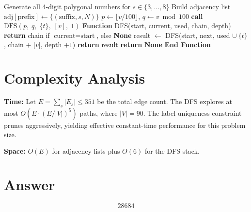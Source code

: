 \documentclass[12pt,a4paper]{article}
\newcommand{\Function}[2]{\STATE \textbf{Function} #1(#2)}
\newcommand{\EndFunction}{\STATE \textbf{End Function}}
\newcommand{\RETURN}{\STATE \textbf{return} }
\begin{document}
\begin{algorithm}[H]
\caption{Cyclical Figurate Number Search}
\begin{algorithmic}[1]
\STATE Generate all 4-digit polygonal numbers for $s \in \{3,\ldots,8\}$
\STATE Build adjacency list $\mathrm{adj}[\text{prefix}] \gets \{(\text{suffix}, s, N)\}$
    \STATE $p \gets \lfloor v/100 \rfloor$, $q \gets v \bmod 100$
    \STATE \textbf{call} $\mathrm{DFS}(p,\; q,\; \{t\},\; [v],\; 1)$
\ENDFOR
\STATE
\Function{DFS}{start, current, used, chain, depth}
        \RETURN chain if $\text{current} = \text{start}$, else \textbf{None}
    \ENDIF
        \STATE result $\gets$ DFS(start, next, used $\cup\ \{t\}$, chain $+$ [$v$], depth $+ 1$)
            \RETURN result
        \ENDIF
    \ENDFOR
    \RETURN \textbf{None}
\EndFunction
\end{algorithmic}
\end{algorithm}

\section{Complexity Analysis}

\textbf{Time:} Let $E = \sum_s |E_s| \le 351$ be the total edge count. The DFS explores at most $O(E \cdot (E/|V|)^5)$ paths, where $|V| = 90$. The label-uniqueness constraint prunes aggressively, yielding effective constant-time performance for this problem size.

\textbf{Space:} $O(E)$ for adjacency lists plus $O(6)$ for the DFS stack.

\section{Answer}

\[
\boxed{28684}
\]
\end{document}
